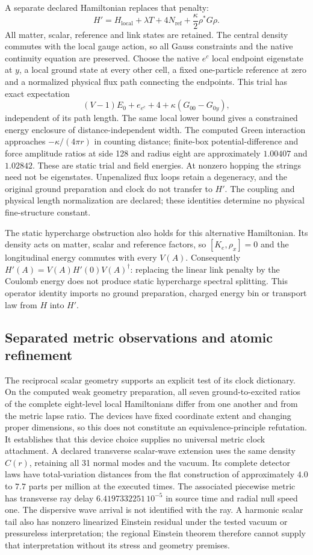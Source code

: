 A separate declared Hamiltonian replaces that penalty:
\[
 H'=H_{\mathrm{local}}+\lambda T+4N_{\mathrm{ref}}
                         +\frac\kappa2\rho^*G\rho.
\]
All matter, scalar, reference and link states are retained. The central
density commutes with the local gauge action, so all Gauss constraints
and the native continuity equation are preserved. Choose the native
$e^c$ local endpoint eigenstate at $y$, a local ground state at every
other cell, a fixed one-particle reference at zero and a normalized
physical flux path connecting the endpoints. This trial has exact expectation
\[
 (V-1)E_0+e_{e^c}+4+\kappa(G_{00}-G_{0y}),
\]
independent of its path length. The same local lower bound gives a
constrained energy enclosure of distance-independent width. The
computed Green interaction approaches $-\kappa/(4\pi r)$ in counting
distance; finite-box potential-difference and force amplitude ratios
at side 128 and radius eight are approximately $1.00407$ and $1.02842$.
These are static trial and field energies. At nonzero hopping the
strings need not be eigenstates. Unpenalized flux loops retain a
degeneracy, and the original ground preparation and clock do not
transfer to $H'$. The coupling and physical length normalization are
declared; these identities determine no physical fine-structure constant.

The static hypercharge obstruction also holds for this alternative
Hamiltonian. Its density acts on matter, scalar and reference factors,
so $[K_e,\rho_x]=0$ and the longitudinal energy commutes with every
$V(A)$. Consequently $H'(A)=V(A)H'(0)V(A)^\dagger$: replacing the
linear link penalty by the Coulomb energy does not produce static
hypercharge spectral splitting. This operator identity imports no ground
preparation, charged energy bin or transport law from $H$ into $H'$.

\subsection{Separated metric observations and atomic refinement}

The reciprocal scalar geometry supports an explicit test of its clock
dictionary. On the computed weak geometry preparation, all seven
ground-to-excited ratios of the complete eight-level local Hamiltonians
differ from one another and from the metric lapse ratio. The devices
have fixed coordinate extent and changing proper dimensions, so this
does not constitute an equivalence-principle refutation. It establishes
that this device choice supplies no universal metric clock attachment.
A declared transverse scalar-wave extension uses the same density
$C(r)$, retaining all 31 normal modes and the vacuum. Its complete
detector laws have total-variation distances from the flat construction
of approximately $4.0$ to $7.7$ parts per million at the executed times. The associated
piecewise metric has transverse ray delay
$6.4197332251\,10^{-5}$ in source time and radial null speed one.
The dispersive wave arrival is not identified with the ray. A harmonic
scalar tail also has nonzero linearized Einstein residual under the
tested vacuum or pressureless interpretation; the regional Einstein
theorem therefore cannot supply that interpretation without its
stress and geometry premises.

